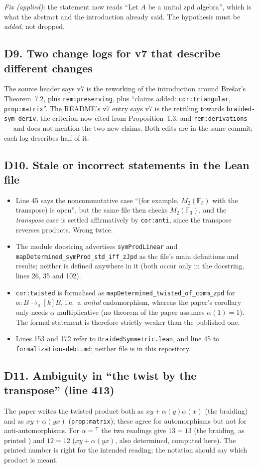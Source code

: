 \documentclass[11pt,a4paper]{article}
\newcommand{\yes}{\checkmark}
\newcommand{\cpt}[1]{\texttt{#1}}          %
\begin{document}
\emph{Fix (applied):} the statement now reads ``Let $A$ be a unital zpd algebra'', which is what the
abstract and the introduction already said. The hypothesis must be \emph{added}, not dropped.

\subsection*{D9. Two change logs for v7 that describe different changes}
The source header says v7 is the reworking of the introduction around Bre\v{s}ar's Theorem~7.2, plus
\cpt{rem:preserving}, plus ``claims added: \cpt{cor:triangular}, \cpt{prop:matrix}''. The README's v7
entry says v7 is the retitling towards \cpt{braided-sym-deriv}, the criterion now cited from
Proposition~1.3, and \cpt{rem:derivations} --- and does not mention the two new claims. Both edits are in
the same commit; each log describes half of it.

\subsection*{D10. Stale or incorrect statements in the Lean file}
\begin{itemize}[leftmargin=1.4em,itemsep=1pt]
\item Line 45 says the noncommutative case ``(for example, $M_2(\mathbb{F}_3)$ with the transpose) is
open'', but the same file then checks $M_2(\mathbb{F}_3)$, and the \emph{transpose} case is settled
affirmatively by \cpt{cor:anti}, since the transpose reverses products. Wrong twice.
\item The module docstring advertises \cpt{symProdLinear} and
\cpt{mapDetermined\_symProd\_std\_iff\_zJpd} as the file's main definitions and results; neither is
defined anywhere in it (both occur only in the docstring, lines 26, 35 and 102).
\item \cpt{cor:twisted} is formalised as \cpt{mapDetermined\_twisted\_of\_comm\_zpd} for
$\alpha\colon B\to_a[k]B$, i.e.\ a \emph{unital} endomorphism, whereas the paper's corollary only needs
$\alpha$ multiplicative (no theorem of the paper assumes $\alpha(1)=1$). The formal statement is
therefore strictly weaker than the published one.
\item Lines 153 and 172 refer to \cpt{BraidedSymmetric.lean}, and line 45 to
\cpt{formalization-debt.md}; neither file is in this repository.
\end{itemize}

\subsection*{D11. Ambiguity in ``the twist by the transpose'' (line 413)}
The paper writes the twisted product both as $xy+\alpha(y)\alpha(x)$ (the braiding) and as
$xy+\alpha(yx)$ (\cpt{prop:matrix}); these agree for automorphisms but not for anti-automorphisms. For
$\alpha={}^{\mathsf T}$ the two readings give $13=13$ (the braiding, as printed \yes) and $12=12$
($xy+\alpha(yx)$, also determined, computed here). The printed number is right for the intended reading;
the notation should say which product is meant.
\end{document}
